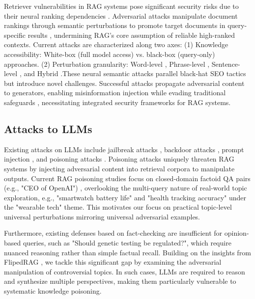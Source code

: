 Retriever vulnerabilities in RAG systems pose significant security risks due to their neural ranking dependencies \cite{goren2018ranking}. Adversarial attacks manipulate document rankings through semantic perturbations to promote target documents in query-specific results \cite{liu2022order,wu2023prada}, undermining RAG's core assumption of reliable high-ranked contexts.
Current attacks are characterized along two axes: (1) Knowledge accessibility: White-box (full model access) vs. black-box (query-only) approaches. (2) Perturbation granularity: Word-level \cite{raval2020one,liu2023black,liu2023topic,wu2023prada}, Phrase-level \cite{song2020adversarial,liu2022order,chen2025flipedragblackboxopinionmanipulation}, Sentence-level \cite{chen2023towards}, and Hybrid \cite{liu2024multi}.These neural semantic attacks parallel black-hat SEO tactics \cite{gyongyi2005web} but introduce novel challenges. Successful attacks propagate adversarial content to generators, enabling misinformation injection while evading traditional safeguards \cite{zhong2023poisoning,chen2025flipedragblackboxopinionmanipulation}, necessitating integrated security frameworks for RAG systems.

\subsection{Attacks to LLMs}

Existing attacks on LLMs include jailbreak attacks \cite{wei2024jailbroken,deng2024masterkey,li2023multi,lin2024figure}, backdoor attacks \cite{kandpal2023backdoor,lu2024test,cao2023stealthy}, prompt injection \cite{liu2023prompt,perez2022ignore,greshake2023not}, and poisoning attacks \cite{shafran2024machine,zou2024poisonedrag,cho2024typos,zhong2023poisoning,chen2025flipedragblackboxopinionmanipulation,zhang2024hijackrag}. Poisoning attacks uniquely threaten RAG systems by injecting adversarial content into retrieval corpora to manipulate outputs. Current RAG poisoning studies focus on closed-domain factoid QA pairs (e.g., "CEO of OpenAI") \cite{zou2024poisonedrag,zhong2023poisoning,cho2024typos,shafran2024machine,zhang2024hijackrag}, overlooking the multi-query nature of real-world topic exploration\cite{liu2023topic,xue2024badrag}, e.g., "smartwatch battery life" and "health tracking accuracy" under the "wearable tech" theme. This motivates our focus on practical topic-level universal perturbations mirroring universal adversarial examples.

Furthermore, existing defenses based on fact-checking are insufficient for opinion-based queries, such as "Should genetic testing be regulated?", which require nuanced reasoning rather than simple factual recall. Building on the insights from FlipedRAG \cite{chen2025flipedragblackboxopinionmanipulation}, we tackle this significant gap by examining the adversarial manipulation of controversial topics. In such cases, LLMs are required to reason and synthesize multiple perspectives, making them particularly vulnerable to systematic knowledge poisoning.